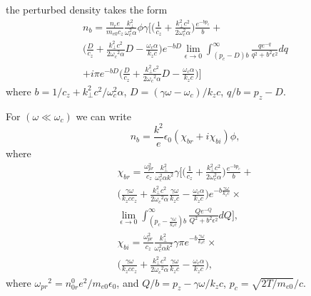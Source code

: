 \documentclass[aip,pop,amsmath,amssymb,showpacs,reprint,floatfix,lengthcheck]{revtex4-1}
\begin{document}
the perturbed density takes the form
\begin{eqnarray}
 n_{b}=\frac{n_{r} e}{m_{e0} c_{z}}\frac{k_{\perp}^2}{\omega_{c}^2\alpha}\phi\gamma\biggl[\biggl(\frac{1}{c_{z}}+\frac{k_{\perp}^2c^2}{2{\omega_{c}^2}\alpha}\biggr)\frac{e^{-bp_{c}}}{b}+\nonumber\\
 \biggl(\frac{D}{c_{z}}+\frac{k_{\perp}^2c^2}{2{\omega_{c}}^2\alpha}D
-\frac{\omega_{c}\alpha}{k_{z}c}\biggr)e^{-bD}\displaystyle\lim_{\epsilon\to 0}\int_{(p_{c}-D)b}^{\infty}\frac{q e^{-q}}{q^2+b^2 {\epsilon}^2}dq\nonumber\\
+i\pi  e^{-bD}\biggl(\frac{D}{c_{z}}+\frac{k_{\perp}^2c^2}{2{\omega_{c}}^2\alpha}D-\frac{\omega_{c}\alpha}{k_{z}c}\biggr)\biggr]\quad
\end{eqnarray}
where $b=1/c_{z}+k_{\perp}^2c^2/{\omega_{c}^2}{\alpha}$, $D=({\gamma \omega-\omega_{c}})/k_{z}c$, $q/b=p_{z}-D $.

For $(\omega \ll \omega_{c})$ we can write
\begin{equation}
 n_{b}=\frac{k^2}{e}\epsilon_{0}(\chi_{br}+i\chi_{bi})\phi, 
\end{equation}
where
\begin{eqnarray}
\chi_{br}=\frac{\omega_{pr}^2}{c_{z}}\frac{k_{\perp}^2}{\omega_{c}^2\alpha k^2}\gamma\biggl[\biggl(\frac{1}{c_{z}}+\frac{k_{\perp}^2c^2}{2{\omega_{c}^2}\alpha}\biggr)\frac{e^{-bp_{c}}}{b}+\nonumber\\
\biggl(\frac{\gamma\omega}{k_{z}cc_{z}}+\frac{k_{\perp}^2c^2}{2{\omega_{c}}^2\alpha}\frac{\gamma\omega}{k_{z}c}-\frac{\omega_{c}\alpha}{k_{z}c}\biggr)e^{-b\frac{\gamma\omega}{k_{z}c}}\times\nonumber\\
\displaystyle\lim_{\epsilon\to 0}\int_{(p_{c}-\frac{\gamma\omega}{k_{z}c})b}^{\infty}\frac{Q e^{-Q}}{Q^2+b^2 {\epsilon}^2}dQ\biggr],\nonumber\\
\chi_{bi}=\frac{\omega_{pr}^2}{c_{z}}\frac{k_{\perp}^2}{\omega_{c}^2\alpha k^2}\gamma \pi  e^{-b\frac{\gamma\omega}{k_{z}c}}\times\nonumber\\
\biggl(\frac{\gamma\omega}{k_{z}cc_{z}}+\frac{k_{\perp}^2c^2}{2{\omega_{c}}^2\alpha}\frac{\gamma\omega}{k_{z}c}-\frac{\omega_{c}\alpha}{k_{z}c}\biggr),
\end{eqnarray}
where ${\omega_{pr}}^2=n_{0r}^{0} e^2/m_{e0}\epsilon_{0}$, and $Q/b=p_{z}-\gamma\omega/k_{z}c$, $p_{c}=\sqrt{2T/m_{e0}}/c$.
 
\end{document}
